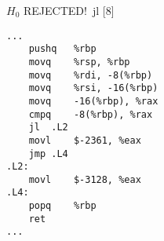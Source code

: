 \begin{figure}[H]
\begin{subfigure}[T]{0.30333333333333334\textwidth}
\begin{lrbox}{\mybox}
%
        \end{lrbox}\resizebox{\textwidth}{!}{\usebox{\mybox}}
\end{subfigure}
\begin{subfigure}[T]{0.30333333333333334\textwidth}
\caption*{}
\end{subfigure}
\begin{subfigure}[T]{0.30333333333333334\textwidth}
\caption*{}
\end{subfigure}
\hspace*{6mm}
\begin{subfigure}[T]{0.2733333333333333\textwidth}
\vspace*{2mm}\tiny {\color{red}$H_0$ REJECTED!}\ \vspace*{2mm}\tiny jl [8]
\begin{lstlisting}[style=defstyle,language={[x86masm]Assembler},basicstyle=\tiny\ttfamily,breaklines=true]
...
	pushq	%rbp
	movq	%rsp, %rbp
	movq	%rdi, -8(%rbp)
	movq	%rsi, -16(%rbp)
	movq	-16(%rbp), %rax
	cmpq	-8(%rbp), %rax
	jl	.L2
	movl	$-2361, %eax
	jmp	.L4
.L2:
	movl	$-3128, %eax
.L4:
	popq	%rbp
	ret
...\end{lstlisting}
\end{subfigure}
\end{figure}
\newpage\noindent